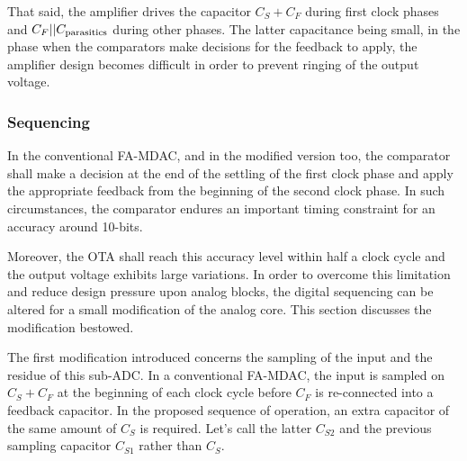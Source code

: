 That said, the amplifier drives the capacitor $C_S+C_F$ during first clock phases and $C_F||C_{\rm parasitics}$ during other phases. The latter capacitance being small, in the phase when the comparators make decisions for the feedback to apply, the amplifier design becomes difficult in order to prevent ringing of the output voltage.

	\subsubsection{Sequencing}
In the conventional FA-MDAC, and in the modified version too, the comparator shall make a decision at the end of the settling of the first clock phase and apply the appropriate feedback from the beginning of the second clock phase. In such circumstances, the comparator endures an important timing constraint for an accuracy around 10-bits.

Moreover, the OTA shall reach this accuracy level within half a clock cycle and the output voltage exhibits large variations. In order to overcome this limitation and reduce design pressure upon analog blocks, the digital sequencing can be altered for a small modification of the analog core. This section discusses the modification bestowed.

The first modification introduced concerns the sampling of the input and the residue of this sub-ADC\@. In a conventional FA-MDAC, the input is sampled on \(C_S + C_F\) at the beginning of each clock cycle before \(C_F\) is re-connected into a feedback capacitor. In the proposed sequence of operation, an extra capacitor of the same amount of \(C_S\) is required. Let's call the latter \(C_{S2}\) and the previous sampling capacitor \(C_{S1}\) rather than \(C_S\).

